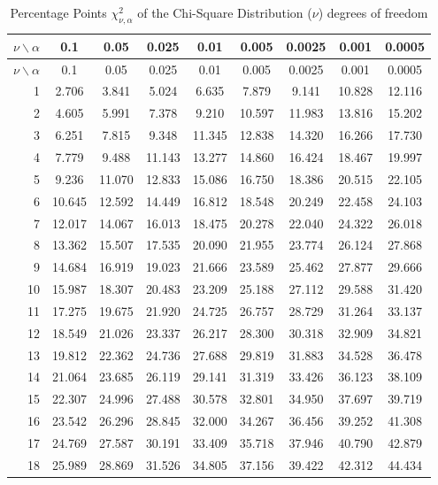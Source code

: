 \documentclass[
]{book}
\theoremstyle{definition}
\theoremstyle{definition}
\theoremstyle{definition}
\theoremstyle{definition}
\theoremstyle{remark}
\begin{document}
\hypertarget{appB:tab:chidist}{}
\begin{longtable}[]{@{}rcccccccc@{}}
\caption{Percentage Points \(\chi^{2}_{\nu,\alpha}\) of the Chi-Square
Distribution (\(\nu\)) degrees of freedom}\tabularnewline
\toprule
\(\nu \backslash \alpha\) & 0.1 & 0.05 & 0.025 & 0.01 & 0.005 & 0.0025 & 0.001 & 0.0005 \\
\midrule
\endfirsthead
\toprule
\(\nu \backslash \alpha\) & 0.1 & 0.05 & 0.025 & 0.01 & 0.005 & 0.0025 & 0.001 & 0.0005 \\
\midrule
\endhead
1 & 2.706 & 3.841 & 5.024 & 6.635 & 7.879 & 9.141 & 10.828 & 12.116 \\
2 & 4.605 & 5.991 & 7.378 & 9.210 & 10.597 & 11.983 & 13.816 & 15.202 \\
3 & 6.251 & 7.815 & 9.348 & 11.345 & 12.838 & 14.320 & 16.266 & 17.730 \\
4 & 7.779 & 9.488 & 11.143 & 13.277 & 14.860 & 16.424 & 18.467 & 19.997 \\
5 & 9.236 & 11.070 & 12.833 & 15.086 & 16.750 & 18.386 & 20.515 & 22.105 \\
6 & 10.645 & 12.592 & 14.449 & 16.812 & 18.548 & 20.249 & 22.458 & 24.103 \\
7 & 12.017 & 14.067 & 16.013 & 18.475 & 20.278 & 22.040 & 24.322 & 26.018 \\
8 & 13.362 & 15.507 & 17.535 & 20.090 & 21.955 & 23.774 & 26.124 & 27.868 \\
9 & 14.684 & 16.919 & 19.023 & 21.666 & 23.589 & 25.462 & 27.877 & 29.666 \\
10 & 15.987 & 18.307 & 20.483 & 23.209 & 25.188 & 27.112 & 29.588 & 31.420 \\
11 & 17.275 & 19.675 & 21.920 & 24.725 & 26.757 & 28.729 & 31.264 & 33.137 \\
12 & 18.549 & 21.026 & 23.337 & 26.217 & 28.300 & 30.318 & 32.909 & 34.821 \\
13 & 19.812 & 22.362 & 24.736 & 27.688 & 29.819 & 31.883 & 34.528 & 36.478 \\
14 & 21.064 & 23.685 & 26.119 & 29.141 & 31.319 & 33.426 & 36.123 & 38.109 \\
15 & 22.307 & 24.996 & 27.488 & 30.578 & 32.801 & 34.950 & 37.697 & 39.719 \\
16 & 23.542 & 26.296 & 28.845 & 32.000 & 34.267 & 36.456 & 39.252 & 41.308 \\
17 & 24.769 & 27.587 & 30.191 & 33.409 & 35.718 & 37.946 & 40.790 & 42.879 \\
18 & 25.989 & 28.869 & 31.526 & 34.805 & 37.156 & 39.422 & 42.312 & 44.434 \\

\end{longtable}
\end{document}
